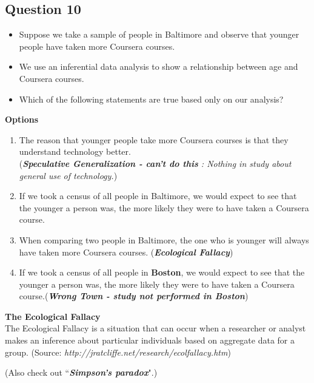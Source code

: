 \documentclass[]{article}
\begin{document}
\subsection*{Question 10}
\begin{itemize}
\item Suppose we take a sample of people in Baltimore and observe that younger people have taken more Coursera courses. 
\item We use an inferential data analysis to show a relationship between age and Coursera courses. 
\item Which of the following statements are true based only on our analysis?
\end{itemize}
\noindent \textbf{Options}
\begin{enumerate}
\item The reason that younger people take more Coursera courses is that they understand technology better. \\(\textit{\textbf{Speculative Generalization - can't do this} : Nothing in study about general use of technology.})			
\item If we took a census of all people in Baltimore, we would expect to see that the younger a person was, the more likely they were to have taken a Coursera course.		
\item When comparing two people in Baltimore, the one who is younger will always have taken more Coursera courses. (\textbf{\textit{Ecological Fallacy}})			
\item If we took a census of all people in \textbf{Boston}, we would expect to see that the younger a person was, the more likely
 they were to have taken a Coursera course.(\textbf{\textit{Wrong Town - study not performed in Boston}})
\end{enumerate}
\vspace{0.5cm}
\noindent \textbf{The Ecological Fallacy}\\
The Ecological Fallacy is a situation that can occur when a researcher or analyst makes an inference about particular individuals based on aggregate data for a group. 
(Source: \textit{http://jratcliffe.net/research/ecolfallacy.htm})

\bigskip
(Also check out ``\textit{\textbf{Simpson's paradox}}".)
\end{document}
